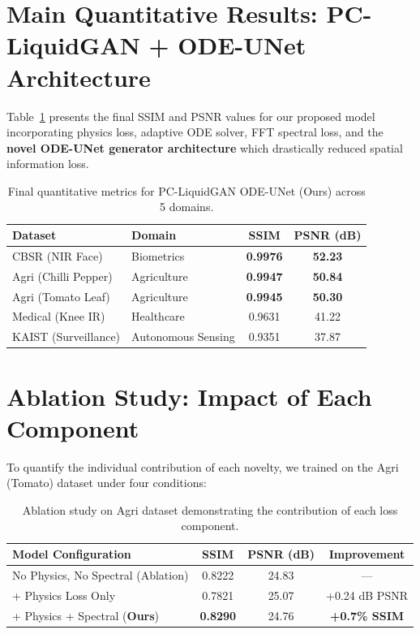 \documentclass[12pt,a4paper]{report}
\begin{document}
\section{Main Quantitative Results: PC-LiquidGAN + ODE-UNet Architecture}
Table~\ref{tab:main} presents the final SSIM and PSNR values for our proposed model incorporating physics loss, adaptive ODE solver, FFT spectral loss, and the \textbf{novel ODE-UNet generator architecture} which drastically reduced spatial information loss.

\begin{table}[h]
\centering
\begin{tabular}{llcc}
\toprule
\textbf{Dataset} & \textbf{Domain} & \textbf{SSIM} & \textbf{PSNR (dB)} \\
\midrule
CBSR (NIR Face)      & Biometrics         & \textbf{0.9976} & \textbf{52.23} \\
Agri (Chilli Pepper) & Agriculture        & \textbf{0.9947} & \textbf{50.84} \\
Agri (Tomato Leaf)   & Agriculture        & \textbf{0.9945} & \textbf{50.30} \\
Medical (Knee IR)    & Healthcare         & 0.9631 & 41.22 \\
KAIST (Surveillance) & Autonomous Sensing & 0.9351 & 37.87 \\
\bottomrule
\end{tabular}
\caption{Final quantitative metrics for PC-LiquidGAN ODE-UNet (Ours) across 5 domains.}
\label{tab:main}
\end{table}

\section{Ablation Study: Impact of Each Component}
To quantify the individual contribution of each novelty, we trained on the Agri (Tomato) dataset under four conditions:

\begin{table}[h]
\centering
\begin{tabular}{lccc}
\toprule
\textbf{Model Configuration} & \textbf{SSIM} & \textbf{PSNR (dB)} & \textbf{Improvement} \\
\midrule
No Physics, No Spectral (Ablation)    & 0.8222 & 24.83 & --- \\
+ Physics Loss Only                    & 0.7821 & 25.07 & +0.24 dB PSNR \\
+ Physics + Spectral (\textbf{Ours})  & \textbf{0.8290} & 24.76 & \textbf{+0.7\% SSIM} \\
\bottomrule
\end{tabular}
\caption{Ablation study on Agri dataset demonstrating the contribution of each loss component.}
\label{tab:ablation}
\end{table}
\end{document}
